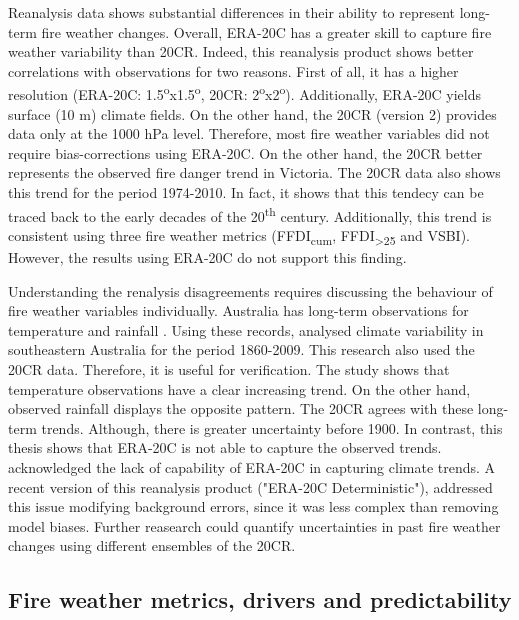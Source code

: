 Reanalysis data shows substantial differences in their ability to
represent long-term fire weather changes. Overall, ERA-20C has a greater
skill to capture fire weather variability than 20CR. Indeed, this
reanalysis product shows better correlations with observations for
two reasons. First of all, it has a higher resolution (ERA-20C: 1.5\textsuperscript{o}x1.5\textsuperscript{o},
20CR: 2\textsuperscript{o}x2\textsuperscript{o}). Additionally,
ERA-20C yields surface (10 m) climate fields. On the other hand, the
20CR (version 2) provides data only at the 1000 hPa level. Therefore,
most fire weather variables did not require bias-corrections using
ERA-20C. On the other hand, the 20CR better represents the observed
fire danger trend in Victoria. The 20CR data also shows this trend
for the period 1974-2010. In fact, it shows that this tendecy can
be traced back to the early decades of the 20\textsuperscript{th}
century. Additionally, this trend is consistent using three fire weather
metrics (FFDI\textsubscript{cum}, FFDI\textsubscript{>25} and VSBI).
However, the results using ERA-20C do not support this finding.

Understanding the renalysis disagreements requires discussing the
behaviour of fire weather variables individually. Australia has long-term
observations for temperature \citep{Trewin2013} and rainfall \citep{Laverly1997}.
Using these records, \citet{Ashcroft2014} analysed climate variability
in southeastern Australia for the period 1860-2009. This research
also used the 20CR data. Therefore, it is useful for verification.
The study shows that temperature observations have a clear increasing
trend. On the other hand, observed rainfall displays the opposite
pattern. The 20CR agrees with these long-term trends. Although, there
is greater uncertainty before 1900. In contrast, this thesis shows
that ERA-20C is not able to capture the observed trends. \citet{Poli2015} acknowledged
the lack of capability of ERA-20C in capturing climate trends. A recent version of this reanalysis 
product ("ERA-20C Deterministic"), addressed this issue modifying background errors, since it was less complex than removing model biases. Further reasearch could quantify uncertainties in past fire weather changes using different ensembles of the 20CR. 


\subsection{Fire weather metrics, drivers and predictability}

